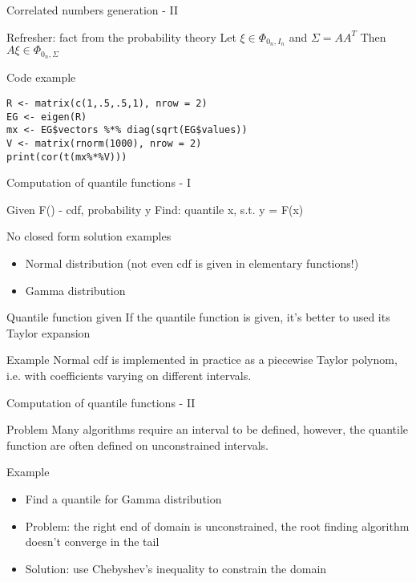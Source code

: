 \documentclass[presentation]{beamer}
\begin{document}
\begin{frame}[fragile,label=sec-2-4]{Correlated numbers generation - II}
 \begin{block}{Refresher: fact from the probability theory}
Let $\xi \in \Phi_{0_n, I_n}$ and $\Sigma = AA^T$
Then $A\xi \in \Phi_{0_n, \Sigma}$
\end{block}
\begin{block}{Code example}
\begin{verbatim}
R <- matrix(c(1,.5,.5,1), nrow = 2)
EG <- eigen(R)
mx <- EG$vectors %*% diag(sqrt(EG$values))
V <- matrix(rnorm(1000), nrow = 2)
print(cor(t(mx%*%V)))
\end{verbatim}
\end{block}
\end{frame}
\begin{frame}[label=sec-2-5]{Computation of quantile functions - I}
\begin{block}{Given}
F() - cdf, probability y
Find: quantile x, s.t. y = F(x)
\end{block}
\begin{block}{No closed form solution examples}
\begin{itemize}
\item Normal distribution (not even cdf is given in elementary functions!)
\item Gamma distribution
\end{itemize}
\end{block}
\begin{block}{Quantile function given}
If the quantile function is given, it's better to used its Taylor expansion
\end{block}
\begin{block}{Example}
Normal cdf is implemented in practice as a piecewise Taylor polynom, i.e. with coefficients varying on different intervals.
\end{block}
\end{frame}
\begin{frame}[label=sec-2-6]{Computation of quantile functions - II}
\begin{block}{Problem}
Many algorithms require an interval to be defined, however, the quantile function are often defined on unconstrained intervals.
\end{block}
\begin{block}{Example}
\begin{itemize}
\item Find a quantile for Gamma distribution
\item Problem: the right end of domain is unconstrained, the root finding algorithm doesn't converge in the tail
\item Solution: use Chebyshev's inequality to constrain the domain
\end{itemize}
\end{block}
\end{frame}
\end{document}
